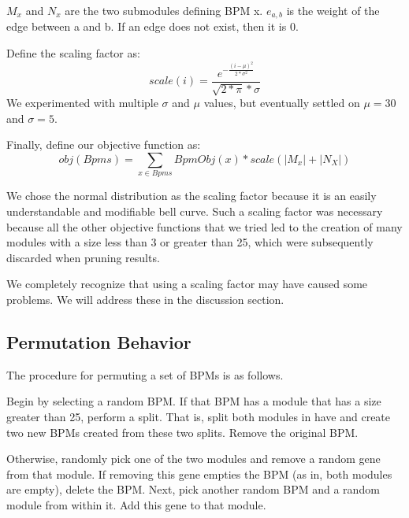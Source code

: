 \documentclass[11pt]{article}
\begin{document}
$M_x$ and $N_x$ are the two submodules defining BPM x. $e_{a, b}$ is the weight of the edge between a and b. If an edge does not exist, then it is 0.

Define the scaling factor as:
$$scale(i) = \frac{e^{-\frac{(i - \mu) ^2}{2*\sigma^2}}}{\sqrt{2 * \pi} * \sigma}$$
We experimented with multiple $\sigma$ and  $\mu$ values, but eventually settled on $\mu = 30$ and $\sigma = 5$. 

Finally, define our objective function as:
$$obj(Bpms) = \sum_{x \in Bpms}{} Bpm Obj(x) * scale(|M_x| + |N_X|) $$

\par We chose the normal distribution as the scaling factor because it is an easily understandable and modifiable bell curve. Such a scaling factor was necessary because all the other objective functions that we tried led to the creation of many modules with a size less than 3 or greater than 25, which were subsequently discarded when pruning results.

\par We completely recognize that using a scaling factor may have caused some problems. We will address these in the discussion section.


\subsection{Permutation Behavior}
\par The procedure for permuting a set of BPMs is as follows.
 
\par Begin by selecting a random BPM. If that BPM has a module that has a size greater than 25, perform a split. That is, split both modules in have and create two new BPMs created from these two splits. Remove the original BPM.

\par Otherwise, randomly pick one of the two modules and remove a random gene from that module. If removing this gene empties the BPM (as in, both modules are empty), delete the BPM. Next, pick another random BPM and a random module from within it. Add this gene to that module. 
\end{document}
